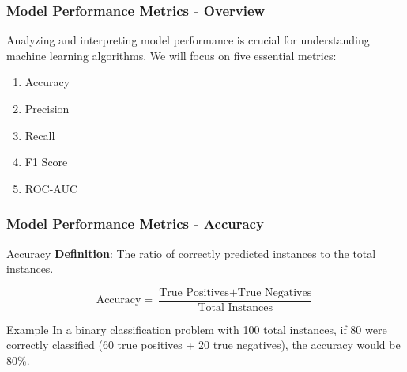 \documentclass[aspectratio=169]{beamer}
\begin{document}
\begin{frame}[fragile]
    \frametitle{Model Performance Metrics - Overview}
    Analyzing and interpreting model performance is crucial for understanding machine learning algorithms. We will focus on five essential metrics:
    \begin{enumerate}
        \item Accuracy
        \item Precision
        \item Recall
        \item F1 Score
        \item ROC-AUC
    \end{enumerate}
\end{frame}

\begin{frame}[fragile]
    \frametitle{Model Performance Metrics - Accuracy}
    \begin{block}{Accuracy}
        \textbf{Definition}: The ratio of correctly predicted instances to the total instances.
    \end{block}
    \begin{equation}
        \text{Accuracy} = \frac{\text{True Positives} + \text{True Negatives}}{\text{Total Instances}}
    \end{equation}
    \begin{block}{Example}
        In a binary classification problem with 100 total instances, if 80 were correctly classified (60 true positives + 20 true negatives), the accuracy would be 80\%.
    \end{block}
\end{frame}
\end{document}
